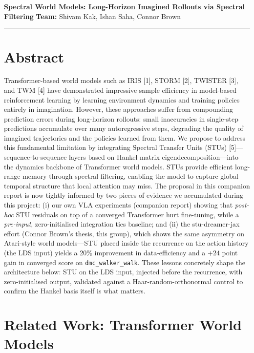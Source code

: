\documentclass[10pt, letterpaper]{article}
\begin{document}
{\large \textbf{Spectral World Models: Long-Horizon Imagined Rollouts via Spectral Filtering}} \hfill \textbf{Team:} Shivam Kak, Ishan Saha, Connor Brown \\
\rule{\textwidth}{0.4pt}

\section*{Abstract}

Transformer-based world models such as IRIS [1], STORM [2], TWISTER [3], and TWM [4] have demonstrated impressive sample efficiency in model-based reinforcement learning by learning environment dynamics and training policies entirely in imagination. However, these approaches suffer from compounding prediction errors during long-horizon rollouts: small inaccuracies in single-step predictions accumulate over many autoregressive steps, degrading the quality of imagined trajectories and the policies learned from them. We propose to address this fundamental limitation by integrating Spectral Transfer Units (STUs) [5]---sequence-to-sequence layers based on Hankel matrix eigendecomposition---into the dynamics backbone of Transformer world models. STUs provide efficient long-range memory through spectral filtering, enabling the model to capture global temporal structure that local attention may miss. The proposal in this companion report is now tightly informed by two pieces of evidence we accumulated during this project: (i) our own VLA experiments (companion report) showing that \emph{post-hoc} STU residuals on top of a converged Transformer hurt fine-tuning, while a \emph{pre-input}, zero-initialised integration ties baseline; and (ii) the stu-dreamer-jax effort (Connor Brown's thesis, this group), which shows the same asymmetry on Atari-style world models---STU placed inside the recurrence on the action history (the LDS input) yields a 20\% improvement in data-efficiency and a $+24$ point gain in converged score on \texttt{dmc\_walker\_walk}. These lessons concretely shape the architecture below: STU on the LDS input, injected before the recurrence, with zero-initialised output, validated against a Haar-random-orthonormal control to confirm the Hankel basis itself is what matters.

\section*{Related Work: Transformer World Models}
\end{document}

